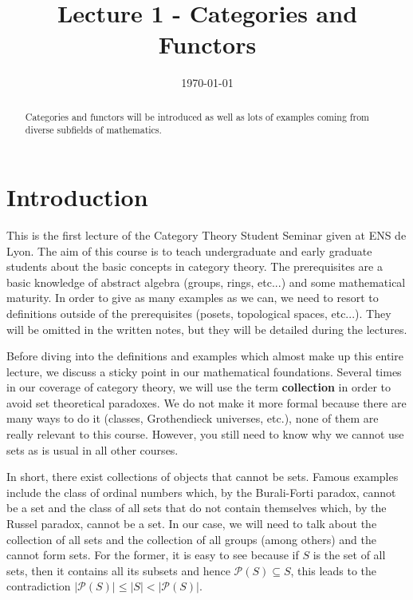 \documentclass{article}
\title{Lecture 1 - Categories and Functors\vspace{-10pt}}
\date{\vspace{-30pt}\today\vspace{-20pt}}  %
\theoremstyle{definition}
\theoremstyle{remark}
\newcommand{\mP}{\mathcal{P}}
\begin{document}
\maketitle
\begin{abstract} Categories and functors will be introduced as well as lots of examples coming from diverse subfields of mathematics.
\end{abstract}
\setcounter{section}{-1}
\section{Introduction}
This is the first lecture of the Category Theory Student Seminar given at ENS de Lyon. The aim of this course is to teach undergraduate and early graduate students about the basic concepts in category theory. The prerequisites are a basic knowledge of abstract algebra (groups, rings, etc...) and some mathematical maturity. In order to give as many examples as we can, we need to resort to definitions outside of the prerequisites (posets, topological spaces, etc...). They will be omitted in the written notes, but they will be detailed during the lectures.

Before diving into the definitions and examples which almost make up this entire lecture, we discuss a sticky point in our mathematical foundations. Several times in our coverage of category theory, we will use the term \textbf{collection} in order to avoid set theoretical paradoxes. We do not make it more formal because there are many ways to do it (classes, Grothendieck universes, etc.), none of them are really relevant to this course. However, you still need to know why we cannot use sets as is usual in all other courses.

In short, there exist collections of objects that cannot be sets. Famous examples include the class of ordinal numbers which, by the Burali-Forti paradox, cannot be a set and the class of all sets that do not contain themselves which, by the Russel paradox, cannot be a set. In our case, we will need to talk about the collection of all sets and the collection of all groups (among others) and the cannot form sets. For the former, it is easy to see because if $S$ is the set of all sets, then it contains all its subsets and hence $\mP(S) \subseteq S$, this leads to the contradiction $|\mP(S)| \leq |S| < |\mP(S)|$.
\end{document}

